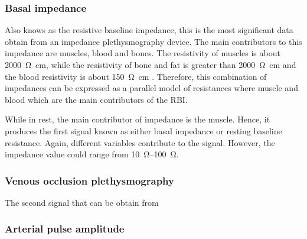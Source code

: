 \subsubsection{Basal impedance}
Also knows as the resistive baseline impedance, this is the most significant data obtain from an impedance plethysmography device. The main contributors to this impedance are muscles, blood and bones. The resistivity of muscles is about \SI{2000}{\ohm\cm}, while the resistivity of bone and fat is greater than \SI{2000}{\ohm\cm} and the blood resistivity is about \SI{150}{\ohm\cm} \cite{gabriel1996dielectric}. Therefore, this combination of impedances can be expressed as a parallel model of resistances where muscle and blood which are the main contributors of the RBI. 

While in rest, the main contributor of impedance is the muscle. Hence, it produces the first signal known as either basal impedance or resting baseline resistance. Again, different variables contribute to the signal. However, the impedance value could range from \SIrange{10}{100}{\ohm}. 

\subsubsection{Venous occlusion plethysmography}
The second signal that can be obtain from

\subsubsection{Arterial pulse amplitude}

